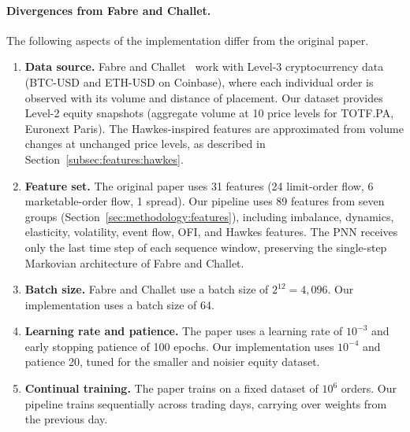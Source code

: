 \documentclass[11pt]{report}
\begin{document}
\paragraph{Divergences from Fabre and Challet.}
The following aspects of the implementation differ from the original paper.
\begin{enumerate}
  \item \textbf{Data source.} Fabre and Challet~\cite{fabre_2025} work with Level-3 cryptocurrency data (BTC-USD and ETH-USD on Coinbase), where each individual order is observed with its volume and distance of placement. Our dataset provides Level-2 equity snapshots (aggregate volume at 10 price levels for TOTF.PA, Euronext Paris). The Hawkes-inspired features are approximated from volume changes at unchanged price levels, as described in Section~\ref{subsec:features:hawkes}.
  \item \textbf{Feature set.} The original paper uses 31 features (24 limit-order flow, 6 marketable-order flow, 1 spread). Our pipeline uses 89 features from seven groups (Section~\ref{sec:methodology:features}), including imbalance, dynamics, elasticity, volatility, event flow, OFI, and Hawkes features. The PNN receives only the last time step of each sequence window, preserving the single-step Markovian architecture of Fabre and Challet.
  \item \textbf{Batch size.} Fabre and Challet use a batch size of $2^{12} = 4{,}096$. Our implementation uses a batch size of 64.
  \item \textbf{Learning rate and patience.} The paper uses a learning rate of $10^{-3}$ and early stopping patience of 100 epochs. Our implementation uses $10^{-4}$ and patience 20, tuned for the smaller and noisier equity dataset.
  \item \textbf{Continual training.} The paper trains on a fixed dataset of $10^6$ orders. Our pipeline trains sequentially across trading days, carrying over weights from the previous day.
\end{enumerate}
\end{document}
